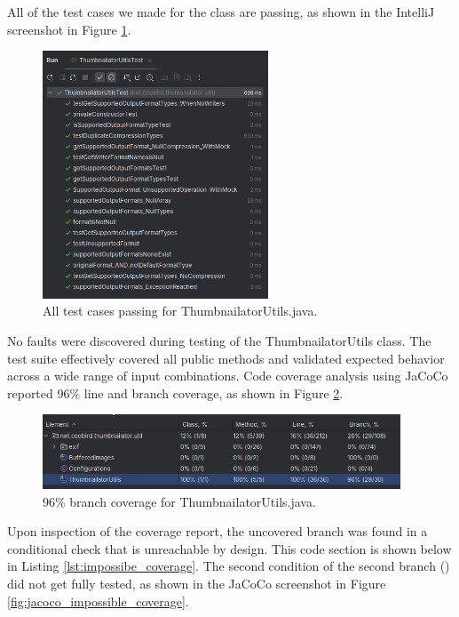 \documentclass[12pt]{article}
\begin{document}
    All of the test cases we made for the  class
        are passing, as shown in the IntelliJ screenshot in Figure
        \ref{fig:thumnailator_utils_test_results}.
    \begin{figure}[H]
        \centering
        \includegraphics[width=0.6\textwidth]{images/thumnailator_utils_test_results.png}
        \caption[All test cases passing for ThumbnailatorUtils.java.]{All test cases passing for ThumbnailatorUtils.java.}
        \label{fig:thumnailator_utils_test_results}
    \end{figure}
    No faults were discovered during testing of the ThumbnailatorUtils class.
    The test suite effectively covered all public methods and validated expected
        behavior across a wide range of input combinations.
    Code coverage analysis using JaCoCo reported 96\% line and
        branch coverage, as shown in Figure \ref{fig:thumnailator_utils_100}.

    \begin{figure}[H]
        \centering
        \includegraphics[width=0.95\textwidth]{images/thumbnailator_utils_100.png}
        \caption[96\% branch coverage for ThumbnailatorUtils.java.]{96\% branch coverage for ThumbnailatorUtils.java.}
        \label{fig:thumnailator_utils_100}
    \end{figure}

    Upon inspection of the coverage report, the uncovered branch was found in a
        conditional check that is unreachable by design.
    This code section is shown below in Listing \ref{lst:impossibe_coverage}.
    The second condition of the second branch ()
        did not get fully tested, as shown in the JaCoCo screenshot in Figure
        \ref{fig:jacoco_impossible_coverage}.
\end{document}
